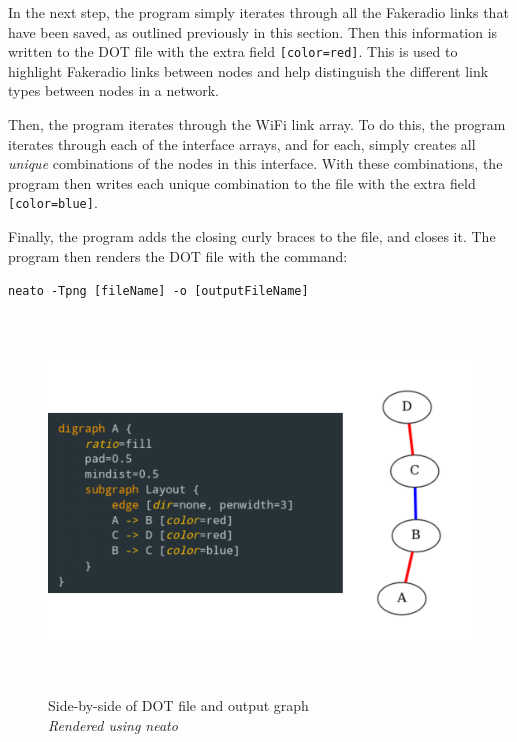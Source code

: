 In the next step, the program simply iterates through all the Fakeradio links that have been saved, as outlined previously in this section.
Then this information is written to the DOT file with the extra field \verb|[color=red]|.
This is used to highlight Fakeradio links between nodes and help distinguish the different link types between nodes in a network.

Then, the program iterates through the WiFi link array. 
To do this, the program iterates through each of the interface arrays, and for each, simply creates all \emph{unique} combinations of the nodes in this interface.
With these combinations, the program then writes each unique combination to the file with the extra field \verb|[color=blue]|.

Finally, the program adds the closing curly braces to the file, and closes it.
The program then renders the DOT file with the command:

\verb|neato -Tpng [fileName] -o [outputFileName]|


\begin{figure}
    \begin{centering}
        \includegraphics[width=15cm,height=10cm,keepaspectratio]{Figures/Chapter5-DotAndRender.png}
        \caption{Side-by-side of DOT file and output graph\\\emph{Rendered using neato}}
        \label{fig:chapter5DotAndRender}
    \end{centering}
\end{figure}


